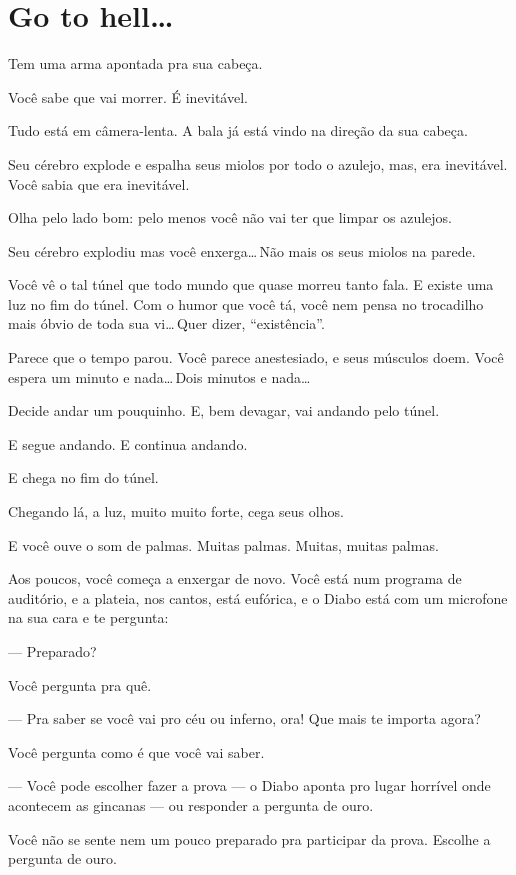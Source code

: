 \chapter{Go to hell\ldots}

Tem uma arma apontada pra sua cabeça.

Você sabe que vai morrer. É inevitável.

Tudo está em câmera-lenta. A bala já está vindo na direção da sua cabeça.

Seu cérebro explode e espalha seus miolos por todo o azulejo, mas, era inevitável. Você sabia que era inevitável.

Olha pelo lado bom: pelo menos você não vai ter que limpar os azulejos.

Seu cérebro explodiu mas você enxerga\ldots\,Não mais os seus miolos na parede.

Você vê o tal túnel que todo mundo que quase morreu tanto fala. E existe uma luz no fim do túnel. Com o humor que você tá, você nem pensa no trocadilho mais óbvio de toda sua vi\ldots\,Quer dizer, ``existência''.

Parece que o tempo parou. Você parece anestesiado, e seus músculos doem. Você espera um minuto e nada\ldots\,Dois minutos e nada\ldots

Decide andar um pouquinho. E, bem devagar, vai andando pelo túnel.

E segue andando. E continua andando.

E chega no fim do túnel.

Chegando lá, a luz, muito muito forte, cega seus olhos.

E você ouve o som de palmas. Muitas palmas. Muitas, muitas palmas.

Aos poucos, você começa a enxergar de novo. Você está num programa de auditório, e a plateia, nos cantos, está eufórica, e o Diabo está com um microfone na sua cara e te pergunta:

--- Preparado?

Você pergunta pra quê.

--- Pra saber se você vai pro céu ou inferno, ora! Que mais te importa agora?

Você pergunta como é que você vai saber.

--- Você pode escolher fazer a prova --- o Diabo aponta pro lugar horrível onde acontecem as gincanas --- ou responder a pergunta de ouro.

Você não se sente nem um pouco preparado pra participar da prova. Escolhe a pergunta de ouro.

